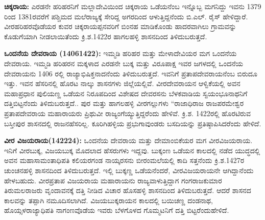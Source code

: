 \textbf{ ಚಿಕ್ಕರಾಯ:} ಎರಡನೇ ಹರಿಹರನಿಗೆ ಮಲ್ಲಾದೇವಿಯಿಂದ ಚಿಕ್ಕರಾಯ ಒಡೆಯನೆಂಬ ಇನ್ನೊಬ್ಬ ಮಗನಿದ್ದು ಇವನು 1379 ರಿಂದ 1381ರವರೆಗೆ ಪಶ್ಚಿಮದ ಮಲೆರಾಜ್ಯಕ್ಕೆ ಸೇರಿದ್ದ ಅಗರದಿಂದ ಆಳುತ್ತಿದ್ದನೆಂದು ಬಿ.ಎಲ್​. ರೈಸ್​ ಹೇಳಿದ್ದಾರೆ. ವೀರಹರಿಹರವೊಡೆಯರ ಕುವರ ಚಿಕ್ಕರಾಯಪ್ಪನವರಿಗೆ ಬಿಂನಹ ಮಾಡಿಕೊಂಡು ಹಾದರವಾಗಿಲು ಗ್ರಾಮವನ್ನು ಕೊಡುಗೆಯಾಗಿ ನೀಡಲಾಯಿತೆಂದು ಕ್ರಿ.ಶ.1422ರ ಹಾಗಲಹಳ್ಳಿ ಶಾಸನದಿಂದ ತಿಳಿದುಬರುತ್ತದೆ. 

\textbf{ ಒಂದನೆಯ ದೇವರಾಯ (14061422): } ಇಮ್ಮಡಿ ಹರಿಹರ ಮತ್ತು ಮೇಳಾದೇವಿಯರ ಮಗ ಒಂದನೆಯ ದೇವರಾಯ. ಇಮ್ಮಡಿ ಹರಿಹರನ ಮಕ್ಕಳಾದ ಎರಡನೇ ಬುಕ್ಕ ಮತ್ತು ವಿರೂಪಾಕ್ಷ ಇವರ ಜಗಳದಲ್ಲಿ ಒಂದನೆಯ ದೇವರಾಯನು 1406 ರಲ್ಲಿ ರಾಜ್ಯಾಭಿಷಿಕ್ತನಾದನೆಂದು ತಿಳಿದುಬರುತ್ತದೆ. ಇವನಿಗೆ ಪ್ರತಾಪದೇವರಾಯನೆಂಬ ಬಿರುದೂ ಇತ್ತು. ಇವನ ಹೆಸರಿನಲ್ಲಿ ಹೊರಟ ನಾಲ್ಕು ಶಾಸನಗಳು ಜಿಲ್ಲೆಯಲ್ಲಿವೆ. ವೀರದೇವರಾಯನ ಆಳ್ವಿಕೆಯಲ್ಲಿ ಅವನ ಮಹಾಪ್ರಧಾನ ಪುಲಿಯಣ್ಣ ಒಡೆಯನ ನಿರೂಪದಿಂದ ವಿಶೇಷದ ದೇವರಸನು ಬೆಳಕವಾಡಿಯ ಸ್ವಯಂಭೂನಾಥನಿಗೆ ದತ್ತಿಬಿಟ್ಟನೆಂದು ತಿಳಿದುಬರುತ್ತದೆ.. ಪುರ ಮತ್ತು ಹಾಗಲಹಳ್ಳಿ ವೀರಗಲ್ಲುಗಳು “ರಾಜಾಧಿರಾಜ ರಾಜಪರಮೇಶ್ವರ ಪ್ರತಾಪದೇವರಾಯ ಮಹಾರಾಯರು ಪ್ರಿಥುವೀ ರಾಜ್ಯಂಗೆಯ್ಯುತ್ತಿದ್ದರೆಂದು ಹೇಳಿವೆ. ಕ್ರಿ.ಶ. 1422ರಲ್ಲಿ ಹೊರಟಿರುವ ಬಸ್ತೀಪುರ ಶಾಸನದಲ್ಲಿ ರಾಜನಹೆಸರಿಲ್ಲ. ಕೂರಿಗಿಹಳ್ಳಿಯ ಪ್ರಭುಗಾವುಂಡರು ಬಸದಿಯನ್ನು ಪ್ರತಿಷ್ಠಾಪಿಸಿದರೆಂದು ಹೇಳಿದೆ. 

\textbf{ ವೀರ ವಿಜಯರಾಯ(142224):} ಒಂದನೆಯ ದೇವರಾಯ ಮತ್ತು ದೇಮಾಂಬಿಕೆಯರ ಮಗ ವೀರವಿಜಯರಾಯ. ಇನಿಗೆ ವೀರಬುಕ್ಕ, ವಿಜಯಬುಕ್ಕ ಮೊದಲಾದ ಹೆಸರುಗಳು ಇದ್ದವು. ಬುಕ್ಕಂಣ ಒಡೆಯನ ಕಾಲದಲ್ಲಿ ನಡೆದ ಯುದ್ಧದಲ್ಲಿ ಅವನ ಮಹಾಸಾಮಂತಾಧಿಪತಿ ಕಲಿಯರಗಂಡ ನಾಯ್ಕರಸನು ಬೀರಂಮಲೆಯಲ್ಲಿ ಕಾದಿ ಸತ್ತನೆಂದು ಕ್ರಿ.ಶ.1427ರ ಚುಂಚನಹಳ್ಳಿ ಶಾಸನದಿಂದ ತಿಳಿದುಬರುತ್ತದೆ. ಇಲ್ಲಿ ಬುಕ್ಕಣ್ಣ ಒಡೆಯನೆಂದರೆ, ವೀರವಿಜಯರಾಯನೇ ಆಗಿದ್ದಾನೆಂದು ಹೇಳಬಹುದು. ವೀರಪ್ರತಾಪ ವಿಜಯರಾಯ ಮಹಾರಾಯನು ರಾಜ್ಯವಾಳುತ್ತಿದ್ದಾಗ ಗಂಗರಾಜಕುಮಾರ ತಿರುಮಲರಾಜರು ವೃಂದಾವನಕ್ಕೆ ದತ್ತಿ ನೀಡಿದ ವಿಚಾರ ಹೊಸಹಳ್ಳಿ ಶಾಸನದಿಂದ ತಿಳಿದುಬರುತ್ತದೆ. ಆದರೆ ಶಾಸನದ ಕಾಲವನ್ನು ತಪ್ಪಾಗಿ ನಮೂದಿಸಲಾಗಿದೆ. ವಿಜಯಬುಕ್ಕರಾಯನ ಕಾಲದಲ್ಲಿ ಬಯಿಚಣ್ಣ ದಂಡನಾಥ, ಹೊಯ್ಸಳರಾಜ್ಯಾಧಿಪತಿ ನಾಗಂಣವೊಡೆಯ ಇವರು ಬೆಳಗೊಳದ ಗೊಮ್ಮಟನಿಗೆ ದತ್ತಿ ಬಿಟ್ಟರೆಂದುಹೇಳಿದೆ. 

